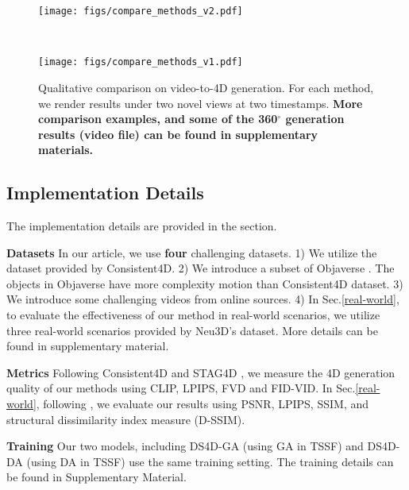 \begin{figure*}[t]
    \centering
	\begin{minipage}{1\linewidth}
        \centerline{\texttt{[image: figs/compare\_methods\_v2.pdf]}}
	\end{minipage}
	\\ \vspace{0.5mm}
	\begin{minipage}{1\linewidth}
        \centerline{\texttt{[image: figs/compare\_methods\_v1.pdf]}}
	\end{minipage}
	\caption{Qualitative comparison on video-to-4D generation. For each method, we render results under two novel views at two timestamps. \textbf{More comparison examples, and some of the 360$^\circ$ generation results (video file) can be found in supplementary materials.}}
\label{show_results}
\end{figure*}

\subsection{Implementation Details}
The implementation details are provided in the section. 

\textbf{Datasets} In our article, we use \textbf{four} challenging datasets. 1) We utilize the dataset provided by Consistent4D. 2) We introduce a subset of Objaverse \cite{deitke2023objaverse,liang2024diffusion4d}. The objects in Objaverse have more complexity motion than Consistent4D dataset. 3) We introduce some challenging videos from online sources. 4) In Sec.\ref{real-world}, to evaluate the effectiveness of our method in real-world scenarios, we utilize three real-world scenarios provided by Neu3D's \cite{li2022neural} dataset. More details can be found in supplementary material.


\textbf{Metrics} Following Consistent4D \cite{jiang2024consistentd} and STAG4D \cite{zeng2024stag4d}, we measure the 4D generation quality of our methods using CLIP, LPIPS, FVD and FID-VID. In Sec.\ref{real-world}, following \cite{wu20244d}, we evaluate our results using PSNR, LPIPS, SSIM, and structural dissimilarity index measure (D-SSIM).




\textbf{Training} Our two models, including DS4D-GA (using GA in TSSF) and DS4D-DA (using DA in TSSF) use the same training setting. The training details can be found in Supplementary Material.





